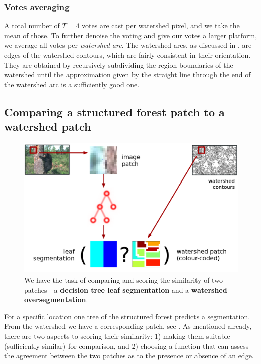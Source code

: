 \subsubsection{Votes averaging}
A total number of $T=4$ votes are cast per watershed pixel, and we take the mean of those. To further denoise the voting and give our votes a larger platform, %
we average all votes per \textit{watershed arc}. The watershed arcs, as discussed in , are edges of the watershed contours, which are fairly consistent in their orientation. They are obtained by recursively subdividing the region boundaries of the watershed until the approximation given by the straight line through the end of the watershed arc is a sufficiently good one. %

\subsection{Comparing a structured forest patch to a watershed patch}
\begin{figure}[ht!]
\centering
 \includegraphics[width=1\textwidth]{images/SE-SV-UCM/weighting-the-watershed-contours-two-patches.png}
\caption[Structured voting essence: a comparison of two patches]{We have the task of comparing and scoring the similarity of two patches - a \textbf{decision tree leaf segmentation} and a \textbf{watershed oversegmentation}.}
\label{fig:weighting-the-watershed-contours}
\end{figure}

For a specific location one tree of the structured forest predicts a segmentation. From the watershed we have a corresponding patch, see . As mentioned already, there are two aspects to scoring their similarity: 1) making them suitable (\ie sufficiently similar) for comparison, and 2) choosing a function that can assess the agreement between the two patches as to the presence or absence of an edge.

